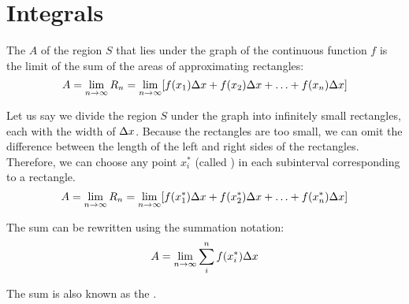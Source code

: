\chapter{Integrals}

    \par The  $A$ of the region $S$ that lies under the graph of the continuous function
    $f$ is the limit of the sum of the areas of approximating rectangles:
    \begin{equation}
        A = \lim_{n \to \infty} R_{n} = \lim_{n \to \infty} [f(x_{1}) \Delta x + f(x_{2}) \Delta x
        + \ldots + f(x_{n}) \Delta x]
    \end{equation}
    \par Let us say we divide the region $S$ under the graph into infinitely small rectangles, 
    each with the width of $\Delta x$. Because the rectangles are too small, we can omit the
    difference between the length of the left and right sides of the rectangles. Therefore, we
    can choose any point $x_{i}^{*}$ (called ) in each subinterval corresponding
    to a rectangle.
    \begin{equation}
        A = \lim_{n \to \infty} R_{n} = \lim_{n \to \infty} [f(x_{1}^{*}) \Delta x + f(x_{2}^{*}) \Delta x
        + \ldots + f(x_{n}^{*}) \Delta x]
    \end{equation}
    \par The sum can be rewritten using the summation notation:
    \begin{equation}
        A = \lim_{n \to \infty} \sum\limits _{i}^{n} f(x_{i}^{*}) \Delta x
    \end{equation}
    \par The sum is also known as the .

